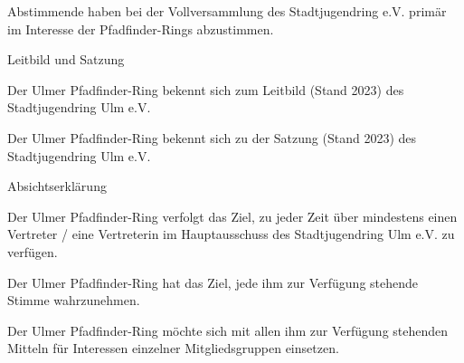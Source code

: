 \begin{legal}
\begin{legal}
\begin{legal}
                    \item Abstimmende haben bei der Vollversammlung des Stadtjugendring e.V. primär 
                          im Interesse der Pfadfinder-Rings abzustimmen.
                \end{legal}
            \item Leitbild und Satzung
                \begin{legal}
                    \item Der Ulmer Pfadfinder-Ring bekennt sich zum Leitbild (Stand 2023) des 
                          Stadtjugendring Ulm e.V.
                    \item Der Ulmer Pfadfinder-Ring bekennt sich zu der Satzung (Stand 2023) des 
                          Stadtjugendring Ulm e.V.
                \end{legal}
        \end{legal}
    \item Absichtserklärung
        \begin{legal}
            \item Der Ulmer Pfadfinder-Ring verfolgt das Ziel, zu jeder Zeit über mindestens einen 
                  Vertreter / eine Vertreterin im Hauptausschuss des Stadtjugendring Ulm e.V. 
                  zu verfügen.
            \item Der Ulmer Pfadfinder-Ring hat das Ziel, jede ihm zur Verfügung stehende Stimme 
                  wahrzunehmen.
            \item Der Ulmer Pfadfinder-Ring möchte sich mit allen ihm zur Verfügung stehenden 
                  Mitteln für Interessen einzelner Mitgliedsgruppen einsetzen.
        \end{legal}
\end{legal}
